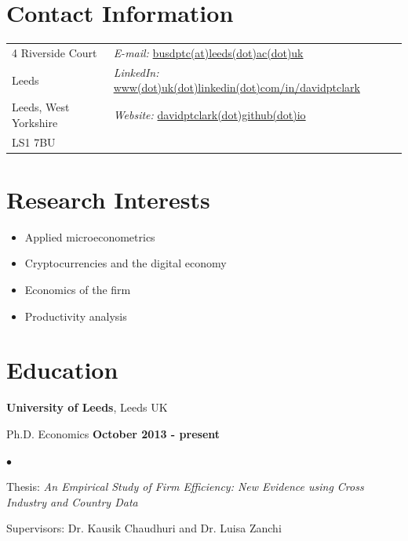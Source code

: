 \documentclass[margin,line,9pt]{res}
\newenvironment{list1}{
  \begin{list}{\ding{113}}{%
      \setlength{\itemsep}{0in}
      \setlength{\parsep}{0in} \setlength{\parskip}{0in}
      \setlength{\topsep}{0in} \setlength{\partopsep}{0in} 
      \setlength{\leftmargin}{0.17in}}}{\end{list}}
\newenvironment{list2}{
  \begin{list}{$\bullet$}{%
      \setlength{\itemsep}{0in}
      \setlength{\parsep}{0in} \setlength{\parskip}{0in}
      \setlength{\topsep}{0in} \setlength{\partopsep}{0in} 
      \setlength{\leftmargin}{0.2in}}}{\end{list}}
\begin{document}

\begin{resume}
\section{\sc Contact Information}
\vspace{.05in}
\begin{tabular}{@{}p{2in}p{4in}}
4 Riverside Court& {\it E-mail:}  \href{mailto:busdptc@leeds.ac.uk}{busdptc(at)leeds(dot)ac(dot)uk}\\ 
Leeds   & {\it LinkedIn:} \href{http://www.linkedin.com/in/davidptclark}{www(dot)uk(dot)linkedin(dot)com/in/davidptclark}\\           
Leeds, West Yorkshire & {\it Website:} \href{http://davidptclark.github.io}{davidptclark(dot)github(dot)io} \\       
LS1 7BU  & \\ 
\end{tabular}


\section{\sc Research Interests}
\begin{itemize}
\item Applied microeconometrics
\item Cryptocurrencies and the digital economy
\item Economics of the firm
\item Productivity analysis	
\end{itemize}

\section{\sc Education}
{\bf University of Leeds}, Leeds UK\\
\vspace*{-.1in}
\begin{list1}
\item[] Ph.D. Economics  \hfill {\bf October 2013 - present}
\begin{list2}
\vspace*{.05in}
\item Thesis: \textit{An Empirical Study of Firm Efficiency: New Evidence using Cross Industry and Country Data}  
\item Supervisors:  Dr. Kausik Chaudhuri and Dr. Luisa Zanchi
\end{list2}
\end{list1}


\end{resume}
\end{document}
